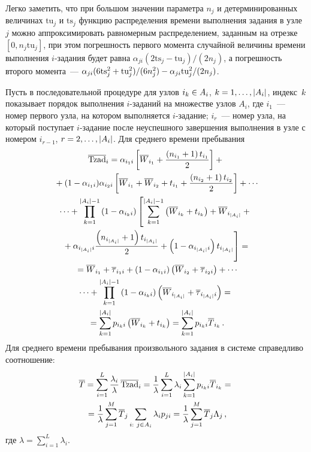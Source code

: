 \begin{multicols}{2}
Легко заметить, что при большом значении параметра $n_j$ и
детерминированных величинах $\mbox{tu}_j$ и $\mbox{ts}_j$ функцию распределения времени
выполнения задания в узле~$j$ можно аппроксимировать равномерным
распределением, заданным на отрезке $[0, n_j \mbox{tu}_j]$, при этом погрешность
первого момента случайной величины времени выполнения $i$-за\-да\-ния
будет равна $\alpha_{ji}(2\mbox{ts}_j-\mbox{tu}_j)/(2n_j)$,
а погрешность второго момента~---
$\alpha_{ji}(6\mbox{ts}_j^2+\mbox{tu}_j^2)/(6n_j^2) \hm- \alpha_{ji} \mbox{tu}_j^2/(2n_j)$.

Пусть в последовательной процедуре для узлов $i_k\hm\in A_i$, $k\hm= 1, \ldots
, \vert A_i\vert$, индекс~$k$ показывает порядок выполнения $i$-за\-да\-ний на
множестве узлов $A_i$, где $i_1$~--- номер первого узла, на котором
выполняется $i$-за\-да\-ние; $i_r$~--- номер узла, на который поступает
$i$-за\-да\-ние после неуспешного завершения выполнения в узле с номером
$i_{r-1}$, $r\hm= 2, \ldots , \vert A_i\vert$. Для среднего времени пребывания
\begin{multline*}
\overline{\mbox{Tzad}}_i = \alpha_{i_1i} \left[ \overline{W}_{i_1}
+\fr{\left(n_{i_1}+1\right)t_{i_1}}{2}\right] +{}\\
{}+ (1-\alpha_{i_1i}) \alpha_{i_2i} \left[ \overline{W}_{i_1} +\overline{W}_{i_2}
+t_{i_1} +\fr{\left(n_{i_2}+1\right)t_{i_2}}{2}\right] +\cdots\\
\cdots + \prod\limits_{k=1}^{\vert A_i\vert -1} \left(1-\alpha_{i_ki}\right)
\left[
\sum\limits_{k=1}^{\vert A_i\vert -1} \left(
\overline{W}_{i_k} +t_{i_k}\right) +
\overline{W}_{i_{\vert A_i\vert }} +{}
\right.
\\
\left.{}+\alpha_{i_{\vert A_i\vert }i}
\fr{\left(n_{i_{\vert A_i\vert }}+1\right)t_{i_{\vert A_i\vert }}}{2}+
\left(1-\alpha_{i_{\vert A_i\vert }i}\right) t_{i_{\vert A_i\vert }}
\vphantom{\sum\limits_{k=1}^{\vert A_i\vert -1}}
\right] = {}\\
{}=\overline{W}_{i_1}+
\overline{\tau}_{i_1i} +\left(1-\alpha_{i_1i}\right) \left(\overline{W}_{i_2}
+\overline{\tau}_{i_2i}\right) +\cdots\\
\cdots + \prod\limits_{k=1}^{\vert A_i\vert -1}
\left(1-\alpha_{i_ki}\right)\left(\overline{W}_{i_{\vert A_i\vert }}
+\overline{\tau}_{i_{\vert A_i\vert }i}\right)={}\\
{}= \sum\limits_{k=1}^{\vert A_i\vert } p_{i_ki}
\left( \overline{W}_{i_k}+t_{i_k}\right) =
\sum\limits_{k=1}^{\vert A_i\vert } p_{i_ki}\overline{T}_{i_k}\,.
\end{multline*}
Для среднего времени пребывания произвольного задания
в системе справедливо соотношение:
\begin{multline*}
\overline{T} = \sum\limits_{i=1}^L \displaystyle\frac{\displaystyle \lambda_i\mathstrut}{\displaystyle \lambda\mathstrut}\,\overline{\mbox{Tzad}}_i =
\displaystyle\frac{\displaystyle 1\mathstrut}{\displaystyle \lambda\mathstrut}\sum\limits_{i=1}^L \lambda_i \sum\limits_{k=1}^{\vert A_i\vert }
p_{i_k i} \overline{T}_{i_k}={}\\
{}= \displaystyle\frac{\displaystyle 1\mathstrut}{\displaystyle \lambda\mathstrut} \sum\limits_{j=1}^M \overline{T}_j \sum\limits_{i:\ j\in A_i}
\lambda_i p_{ji} =\displaystyle\frac{\displaystyle 1\mathstrut}{\displaystyle \lambda\mathstrut} \sum\limits_{j=1}^M \overline{T}_j\Lambda_j\,,
\end{multline*}
где $\lambda= \sum\limits_{i=1}^L \lambda_i$.


\end{multicols}
